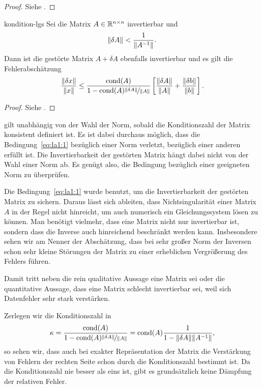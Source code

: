 \begin{proof}
  Siehe \cite[Hilfssatz 4.4]{Rannacher17}.
\end{proof}

\begin{Satz}{kondition-lgs}
  Sei die Matrix $A\in\mathbb R^{n\times n}$ invertierbar und
  \begin{gather}
    \label{eq:la1:1}
    \lVert\delta A\rVert < \frac1{\lVert A^{-1}\rVert}.
  \end{gather}
  Dann ist die gestörte Matrix $A+\delta A$ ebenfalls invertierbar und
  es gilt die Fehlerabschätzung
  \begin{gather}
    \frac{\lVert\delta x\rVert}{\lVert x\rVert}
    \le \frac{\operatorname{cond}(A)}{1-\operatorname{cond}(A)\nicefrac{\lVert\delta A\rVert}{{\lVert A\rVert}}}
    \left[\frac{\lVert\delta A\rVert}{\lVert A\rVert}
      +\frac{\lVert\delta b\rVert}{\lVert b\rVert}\right].
  \end{gather}
\end{Satz}

\begin{proof}
  Siehe \cite[Satz 4.1]{Rannacher17}.
\end{proof}

\begin{remark}
   gilt unabhängig von der Wahl der
  Norm, sobald die Konditionszahl der Matrix konsistent definiert
  ist. Es ist dabei durchaus möglich, dass die
  Bedingung~\eqref{eq:la1:1} bezüglich einer Norm verletzt, bezüglich
  einer anderen erfüllt ist. Die Invertierbarkeit der gestörten Matrix
  hängt dabei nicht von der Wahl einer Norm ab. Es genügt also, die
  Bedingung bezüglich einer geeigneten Norm zu überprüfen.
\end{remark}

\begin{remark}
  Die Bedingung~\eqref{eq:la1:1} wurde benutzt, um die
  Invertierbarkeit der gestörten Matrix zu sichern. Daraus lässt sich
  ableiten, dass Nichtsingularität einer Matrix $A$ in der Regel nicht
  hinreicht, um auch numerisch ein Gleichungssystem lösen zu
  können. Man benötigt vielmehr, dass eine Matrix nicht nur
  invertierbar ist, sondern dass die Inverse auch hinreichend
  beschränkt werden kann. Insbesondere sehen wir am Nenner der
  Abschätzung, dass bei sehr großer Norm der Inversen schon sehr
  kleine Störungen der Matrix zu einer erheblichen Vergrößerung des
  Fehlers führen.

  Damit tritt neben die rein qualitative Aussage eine Matrix sei
   oder  die quantitative
  Aussage, dass eine Matrix schlecht invertierbar sei, weil sich
  Datenfehler sehr stark verstärken.

  Zerlegen wir die Konditionszahl in
  \begin{gather}
    \kappa = \frac{\operatorname{cond}(A)}{1-\operatorname{cond}(A)\nicefrac{\lVert\delta A\rVert}{\lVert A\rVert}}
    =\operatorname{cond}(A)\frac{1}{1-\lVert\delta A\rVert{\lVert A^{-1}\rVert}},
  \end{gather}
  so sehen wir, dass auch bei exakter Repräsentation der Matrix die
  Verstärkung von Fehlern der rechten Seite schon durch die
  Konditionszahl bestimmt ist. Da die Konditionszahl nie besser als
  eins ist, gibt es grundsätzlich keine Dämpfung der relativen Fehler.
\end{remark}

